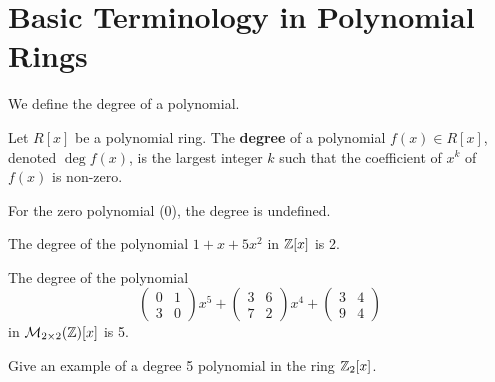 \section{Basic Terminology in Polynomial Rings}
We define the degree of a polynomial.
\begin{definition}
    Let $R[x]$ be a polynomial ring. The \textbf{degree} of a polynomial $f(x) \in R[x]$, denoted $\deg f(x)$, is the largest integer $k$ such that the coefficient of $x^k$ of $f(x)$ is non-zero.
\end{definition}
\begin{remark}
    For the zero polynomial (0), the degree is undefined.
\end{remark}
\begin{example}
    The degree of the polynomial $1+x+5x^2$ in $\mathbb{Z}[x]$ is 2.
\end{example}
\begin{example}
    The degree of the polynomial
    \[
        \begin{pmatrix}0&1\\3&0\end{pmatrix}x^5 + \begin{pmatrix}3&6\\7&2\end{pmatrix}x^4 + \begin{pmatrix}3&4\\9&4\end{pmatrix}
    \]
    in $\mathcal{M}_{2\times2}(\mathbb{Z})[x]$ is 5.
\end{example}
\begin{exercise}
    Give an example of a degree 5 polynomial in the ring $\mathbb{Z}_2[x]$.
\end{exercise}


